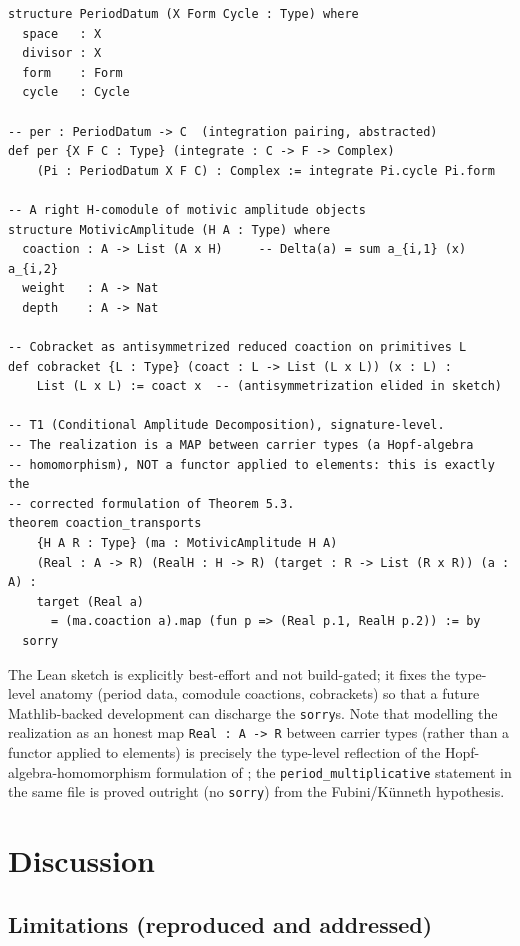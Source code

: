 \documentclass[12pt]{article}
\theoremstyle{definition}
\theoremstyle{remark}
\begin{document}
\begin{verbatim}
structure PeriodDatum (X Form Cycle : Type) where
  space   : X
  divisor : X
  form    : Form
  cycle   : Cycle

-- per : PeriodDatum -> C  (integration pairing, abstracted)
def per {X F C : Type} (integrate : C -> F -> Complex)
    (Pi : PeriodDatum X F C) : Complex := integrate Pi.cycle Pi.form

-- A right H-comodule of motivic amplitude objects
structure MotivicAmplitude (H A : Type) where
  coaction : A -> List (A x H)     -- Delta(a) = sum a_{i,1} (x) a_{i,2}
  weight   : A -> Nat
  depth    : A -> Nat

-- Cobracket as antisymmetrized reduced coaction on primitives L
def cobracket {L : Type} (coact : L -> List (L x L)) (x : L) :
    List (L x L) := coact x  -- (antisymmetrization elided in sketch)

-- T1 (Conditional Amplitude Decomposition), signature-level.
-- The realization is a MAP between carrier types (a Hopf-algebra
-- homomorphism), NOT a functor applied to elements: this is exactly the
-- corrected formulation of Theorem 5.3.
theorem coaction_transports
    {H A R : Type} (ma : MotivicAmplitude H A)
    (Real : A -> R) (RealH : H -> R) (target : R -> List (R x R)) (a : A) :
    target (Real a)
      = (ma.coaction a).map (fun p => (Real p.1, RealH p.2)) := by
  sorry
\end{verbatim}

The Lean sketch is explicitly best-effort and not build-gated; it fixes the type-level
anatomy (period data, comodule coactions, cobrackets) so that a future Mathlib-backed
development can discharge the \texttt{sorry}s. Note that modelling the realization as an
honest map \texttt{Real : A -> R} between carrier types (rather than a functor applied to
elements) is precisely the type-level reflection of the Hopf-algebra-homomorphism formulation
of ; the \texttt{period\_multiplicative} statement in the same file is proved
outright (no \texttt{sorry}) from the Fubini/K\"unneth hypothesis.

\section{Discussion}
\label{sec:discussion}

\subsection{Limitations (reproduced and addressed)}
\end{document}
